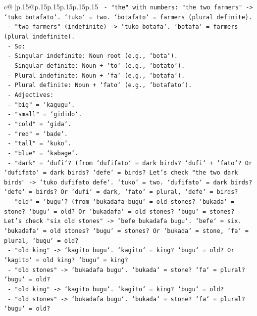 \documentclass{article}
\begin{document}
{\begin{supertabular}{c@{$\;$}|p{.15\linewidth}@{}p{.15\linewidth}p{.15\linewidth}p{.15\linewidth}p{.15\linewidth}p{.15\linewidth}}
{{{\texttt{    {-} "the" with numbers: "the two farmers" {-}> `tuko botafato`. `tuko` = two. `botafato` = farmers (plural definite).} \\
\texttt{    {-} "two farmers" (indefinite) {-}> `tuko botafa`. `botafa` = farmers (plural indefinite).} \\
\texttt{    {-} So:} \\
\texttt{        {-} Singular indefinite: Noun root (e.g., `bota`).} \\
\texttt{        {-} Singular definite: Noun + `to` (e.g., `botato`).} \\
\texttt{        {-} Plural indefinite: Noun + `fa` (e.g., `botafa`).} \\
\texttt{        {-} Plural definite: Noun + `fato` (e.g., `botafato`).} \\
\texttt{    {-} Adjectives:} \\
\texttt{        {-} "big" = `kagugu`.} \\
\texttt{        {-} "small" = `gidido`.} \\
\texttt{        {-} "cold" = `gida`.} \\
\texttt{        {-} "red" = `bade`.} \\
\texttt{        {-} "tall" = `kuko`.} \\
\texttt{        {-} "blue" = `kabage`.} \\
\texttt{        {-} "dark" = `dufi`? (from `dufifato` = dark birds? `dufi` + `fato`? Or `dufifato` = dark birds? `defe` = birds? Let's check "the two dark birds" {-}> `tuko dufifato defe`. `tuko` = two. `dufifato` = dark birds? `defe` = birds? Or `dufi` = dark, `fato` = plural, `defe` = birds?} \\
\texttt{        {-} "old" = `bugu`? (from `bukadafa bugu` = old stones? `bukada` = stone? `bugu` = old? Or `bukadafa` = old stones? `bugu` = stones? Let's check "six old stones" {-}> `befe bukadafa bugu`. `befe` = six. `bukadafa` = old stones? `bugu` = stones? Or `bukada` = stone, `fa` = plural, `bugu` = old?} \\
\texttt{        {-} "old king" {-}> `kagito bugu`. `kagito` = king? `bugu` = old? Or `kagito` = old king? `bugu` = king?} \\
\texttt{        {-} "old stones" {-}> `bukadafa bugu`. `bukada` = stone? `fa` = plural? `bugu` = old?} \\
\texttt{        {-} "old king" {-}> `kagito bugu`. `kagito` = king? `bugu` = old?} \\
\texttt{        {-} "old stones" {-}> `bukadafa bugu`. `bukada` = stone? `fa` = plural? `bugu` = old?} \\
}}}
\end{supertabular}}
\end{document}
